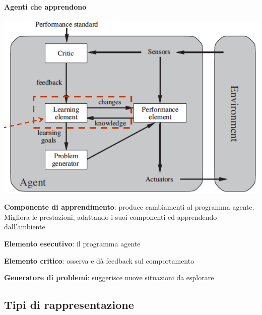 \documentclass[10pt]{book}
\begin{document}
\paragraph{Agenti che apprendono}
\begin{center}
	\includegraphics[scale=0.5]{agappr.png}
\end{center}
\begin{list}{}{}
	\item \textbf{Componente di apprendimento}: produce cambiamenti al programma agente. Migliora le prestazioni, adattando i suoi componenti ed apprendendo dall'ambiente
	\item \textbf{Elemento esecutivo}: il programma agente
	\item \textbf{Elemento critico}: osserva e dà feedback sul comportamento
	\item \textbf{Generatore di problemi}: suggerisce nuove situazioni da esplorare
\end{list}
\pagebreak
\subsection{Tipi di rappresentazione}
\end{document}
